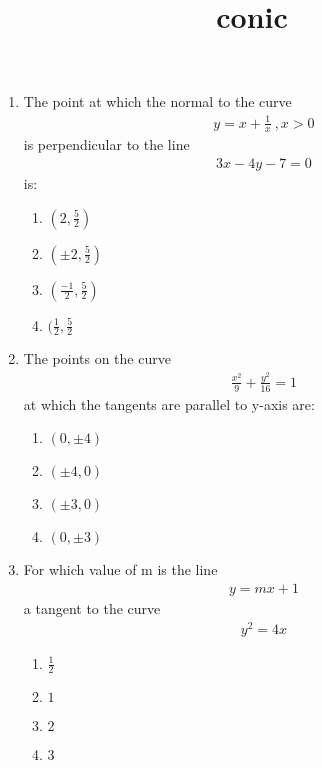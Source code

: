 \documentclass{article}
\title{conic}
\begin{document}
\begin{enumerate}
\item The point at which the normal to the curve 
	\begin{align}
		y = x+ \frac{1}{x} \: ,x>0 
	\end{align}
	 is perpendicular to the line 
		\begin{align}
			3x-4y-7 = 0 
		\end{align}
	is:
\begin{enumerate}[label=(\alph*)]
\item $(2,\frac{5}{2})$
\item $(\pm{2},\frac{5}{2})$
\item $(\frac{-1}{2},\frac{5}{2})$
\item $(\frac{1}{2},\frac{5}{2}$
\end{enumerate}
\item The points on the curve 
	\begin{align}
		\frac{x^2}{9} + \frac{y^2}{16} = 1
	\end{align}
	at which the tangents are parallel to y-axis are:
	\begin{enumerate}[label=(\alph*)]
		\item $(0,\pm{4})$
		\item $(\pm{4},0)$
		\item $(\pm{3},0)$
		\item $(0,\pm{3})$
	\end{enumerate}
\item For which value of m is the line 
	\begin{align}
		y = mx +1
	\end{align}
	a tangent to the curve 
		\begin{align}
			y^2= 4x 
		\end{align}
	\begin{enumerate}[label=(\alph*)]
		\item $\frac{1}{2}$
		\item $1$
		\item $2$
		\item $3$
	\end{enumerate}
\end{enumerate}
\end{document}
